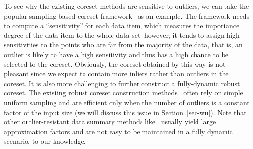 \documentclass{article}
\begin{document}
To see why the existing coreset methods are sensitive to outliers, we can take the popular sampling based coreset framework~\cite{FeldmanL11} as an example. The framework needs to compute a ``sensitivity'' for each data item, which measures the importance degree of the data item to the whole data set; however, it tends to assign high sensitivities to the points who are far from the majority of the data, that is, an outlier is likely to have a high sensitivity and thus has a high chance to be selected to the coreset. Obviously, the coreset obtained by this way is not pleasant since we expect to contain more inliers rather than outliers in the coreset. It is also more challenging to further construct a fully-dynamic robust coreset. The existing robust coreset construction methods~\cite{FeldmanL11,HuangJLW18} often rely on simple uniform sampling and are efficient only when the number of outliers is a constant factor of the input size (we will discuss this issue in Section~\ref{sec-wu}). 
Note that other 
outlier-resistant data summary methods like~\cite{GuptaLSM2017,ChenA018} usually yield large approximation factors 
and are not easy to be maintained in a fully dynamic scenario, to our knowledge.
\end{document}
